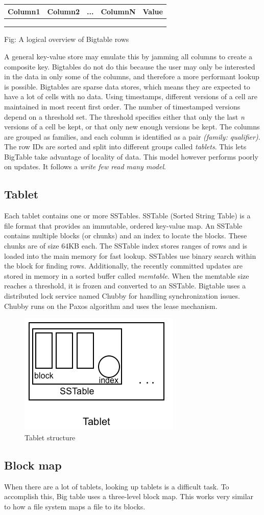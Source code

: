 \documentclass[twoside]{article}
\begin{document}
\begin{tabular}{|c|c|c|c||c|}
\hline
Column1 & Column2 & ... & ColumnN & Value \\
\hline
        &         &     &         &       \\
\hline
        &         &     &         &       \\
\hline
        &         &     &         &       \\
\hline
\end{tabular}
Fig: A logical overview of Bigtable rows

A general key-value store may emulate this by jamming all columns to create a composite key. Bigtables do not do this because the user may only be interested in the data in only some of the columns, and therefore a more performant lookup is possible. Bigtables are sparse data stores, which means they are expected to have a lot of cells with no data. Using timestamps, different versions of a cell are maintained in most recent first order. The number of timestamped versions depend on a threshold set. The threshold specifies either that only the last \textit{n} versions of a cell be kept, or that only new enough versions be kept. The columns are grouped as families, and each column is identified as a pair \textit{(family: qualifier)}. The row IDs are sorted and split into different groups called \textit{tablets}. This lets BigTable take advantage of locality of data. This model however performs poorly on updates. It follows a \textit{write few read many model}.

\subsection{Tablet}
Each tablet contains one or more SSTables. SSTable (Sorted String Table) is a file format that provides an immutable, ordered key-value map. An SSTable contains multiple blocks (or chunks) and an index to locate the blocks. These chunks are of size 64KB each. The SSTable index stores ranges of rows and is loaded into the main memory for fast lookup. SSTables use binary search within the block for finding rows. Additionally, the recently committed updates are stored in memory in a sorted buffer called \textit{memtable}. When the memtable size reaches a threshold, it is frozen and converted to an SSTable. Bigtable uses a distributed lock service named Chubby for handling synchronization issues. Chubby runs on the Paxos algorithm and uses the lease mechanism.
\begin{figure}[h]
\centering
\includegraphics[width=0.5\linewidth]{tablet}
\caption[]{Tablet structure}
\end{figure}

\subsection{Block map}
When there are a lot of tablets, looking up tablets is a difficult task. To accomplish this, Big table uses a three-level block map. This works very similar to how a file system maps a file to its blocks.
\end{document}
